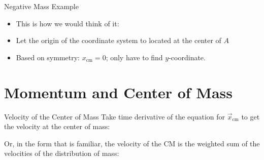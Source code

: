 \documentclass[12pt,compress,aspectratio=169]{beamer}
\begin{document}
\begin{frame}{Negative Mass Example}
  \begin{itemize}
  \item This is how we would think of it:
    \begin{center}
    \end{center}
  \item Let the origin of the coordinate system to located at the center of $A$
  \item Based on symmetry: $x_\text{cm}=0$; only have to find $y$-coordinate.
  \end{itemize}

\end{frame}



\section{Momentum and Center of Mass}

\begin{frame}{Velocity of the Center of Mass}
  Take time derivative of the equation for $\vec x_\text{cm}$ to get the
  velocity at the center of mass:


  Or, in the form that is familiar, the velocity of the CM is the
  weighted sum of the velocities of the distribution of mass:
  
\end{frame}
\end{document}
